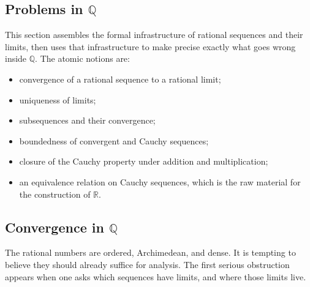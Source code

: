 
\subsection{Problems in $\mathbb{Q}$}
\label{sec:problems-in-q}

\begin{tcolorbox}[
  colback=gray!6,
  colframe=gray!40,
  arc=2pt,
  left=8pt, right=8pt, top=6pt, bottom=6pt,
  title={\small\textbf{Toolkit: Problems in $\mathbb{Q}$}},
  fonttitle=\small\bfseries
]
This section assembles the formal infrastructure of rational sequences and
their limits, then uses that infrastructure to make precise exactly what goes
wrong inside $\mathbb{Q}$.  The atomic notions are:
\begin{itemize}
  \item convergence of a rational sequence to a rational limit;
  \item uniqueness of limits;
  \item subsequences and their convergence;
  \item boundedness of convergent and Cauchy sequences;
  \item closure of the Cauchy property under addition and multiplication;
  \item an equivalence relation on Cauchy sequences, which is the
        raw material for the construction of $\mathbb{R}$.
\end{itemize}
\end{tcolorbox}

\subsection{Convergence in $\mathbb{Q}$}
\label{subsec:convergence-q}

\begin{remark}
The rational numbers are ordered, Archimedean, and dense.  It is tempting
to believe they should already suffice for analysis.  The first serious
obstruction appears when one asks which sequences have limits, and where
those limits live.
\end{remark}

